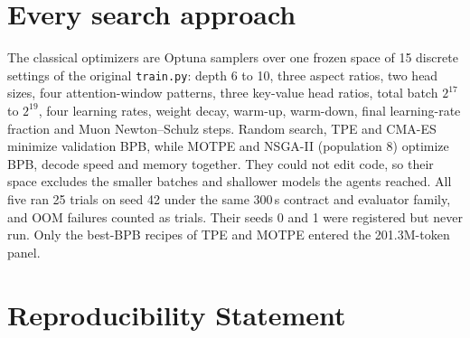 \documentclass{article}
\begin{document}
\section{Every search approach}\label{app:approaches}
\begin{table}[H]
\caption{Every search approach and what became of its recipes. Attempts: scheduled (completed and trained). Best val BPB: the lowest validation BPB of one archived 300\,s discovery run, per seed for AutoPareto (0 / 1 / 42) and for AutoResearch's 50-attempt campaign / 5-attempt follow-up. These are single noisy runs (pooled seed SD \CRPooledSD), comparable only within one seed and phase: the starting model's score differs by \CRBaseSeedEffect{} BPB between seeds 0 and 42, and the extended harness is another setting. Verified: retrained at 201.3M matched tokens on new seeds (Table~\ref{tab:main}), in E1, or re-measured on a fresh A40.}\label{tab:approaches}
\centering\scriptsize\setlength{\tabcolsep}{3pt}
\end{table}
The classical optimizers are Optuna samplers over one frozen space of 15 discrete settings of the original \texttt{train.py}: depth 6 to 10, three aspect ratios, two head sizes, four attention-window patterns, three key-value head ratios, total batch $2^{17}$ to $2^{19}$, four learning rates, weight decay, warm-up, warm-down, final learning-rate fraction and Muon Newton--Schulz steps. Random search, TPE and CMA-ES minimize validation BPB, while MOTPE and NSGA-II (population 8) optimize BPB, decode speed and memory together. They could not edit code, so their space excludes the smaller batches and shallower models the agents reached. All five ran 25 trials on seed 42 under the same 300\,s contract and evaluator family, and OOM failures counted as trials. Their seeds 0 and 1 were registered but never run. Only the best-BPB recipes of TPE and MOTPE entered the 201.3M-token panel.

\section{Reproducibility Statement}\label{app:repro}
\end{document}
